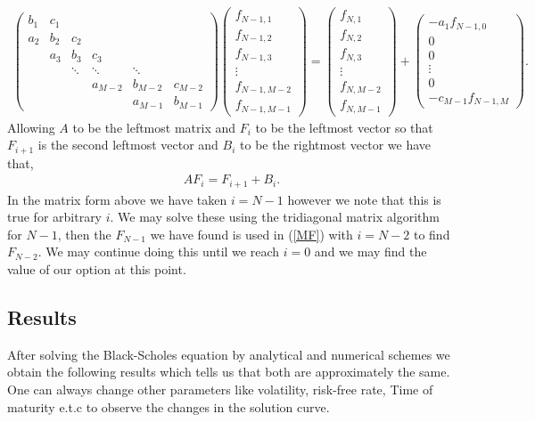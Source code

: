 \documentclass[12pt]{article}
\begin{document}
\begin{align*}
	\begin{pmatrix}
		b_{1} & c_{1} &&&&  \\
		a_{2} & b_{2} & c_2 &&&\\
		& a_{3} & b_{3} & c_3 &&\\
		&& \ddots & \ddots  & \ddots&\\
		&&& a_{M-2}&b_{M-2}&c_{M-2} \\
		&&&&a_{M-1}&b_{M-1} 
	\end{pmatrix}
	\begin{pmatrix}
		f_{N-1,1} \\
		f_{N-1,2} \\
		f_{N-1,3} \\
		\vdots \\
		f_{N-1,M-2}  \\
		f_{N-1,M-1}
	\end{pmatrix}
	= 
	\begin{pmatrix}
		f_{N,1} \\
		f_{N,2} \\
		f_{N,3} \\
		\vdots \\
		f_{N,M-2}  \\
		f_{N,M-1}
	\end{pmatrix}
	+ 
	\begin{pmatrix}
		-a_1f_{N-1,0} \\
		0 \\
		0 \\
		\vdots \\
		0  \\
		-c_{M-1}f_{N-1,M}
	\end{pmatrix}.
\end{align*}
Allowing $A$ to be the leftmost matrix and $F_i$ to be the leftmost vector so that $F_{i+1}$ is the second leftmost vector and $B_i$ to be the rightmost vector we have that,
\begin{align}
	AF_i = F_{i+1} + B_i. \label{MF}
\end{align}
In the matrix form above we have taken $i=N-1$ however we note that this is true for arbitrary $i$.
We may solve these using the tridiagonal matrix algorithm for $N-1$, then the $F_{N-1}$ we have found is used in (\ref{MF}) with $i=N-2$ to find $F_{N-2}$. We may continue doing this until we reach $i=0$ and we may find the value of our option at this point.
\cite{bworld1}

\subsection{Results}
 After solving the Black-Scholes equation by analytical and numerical schemes we obtain the following results which tells us that both are approximately the same. One can always change other parameters like volatility, risk-free rate, Time of maturity e.t.c to observe the changes in the solution curve.
 
\end{document}
